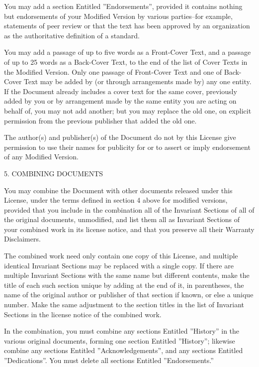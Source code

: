 You may add a section Entitled ''Endorsements'', provided it contains nothing but endorsements of your Modified Version
by various parties--for example, statements of peer review or that the text has been approved by an organization as the
authoritative definition of a standard.

You may add a passage of up to five words as a Front-Cover Text, and a passage of up to 25 words as a Back-Cover Text,
to the end of the list of Cover Texts in the Modified Version. Only one passage of Front-Cover Text and one of
Back-Cover Text may be added by (or through arrangements made by) any one entity. If the Document already includes a
cover text for the same cover, previously added by you or by arrangement made by the same entity you are acting on
behalf of, you may not add another; but you may replace the old one, on explicit permission from the previous publisher
that added the old one.

The author(s) and publisher(s) of the Document do not by this License give permission to use their names for publicity
for or to assert or imply endorsement of any Modified Version.

5. COMBINING DOCUMENTS

You may combine the Document with other documents released under this License, under the terms defined in section 4
above for modified versions, provided that you include in the combination all of the Invariant Sections of all of the
original documents, unmodified, and list them all as Invariant Sections of your combined work in its license notice,
and that you preserve all their Warranty Disclaimers.

The combined work need only contain one copy of this License, and multiple identical Invariant Sections may be replaced
with a single copy. If there are multiple Invariant Sections with the same name but different contents, make the title
of each such section unique by adding at the end of it, in parentheses, the name of the original author or publisher of
that section if known, or else a unique number. Make the same adjustment to the section titles in the list of Invariant
Sections in the license notice of the combined work.

In the combination, you must combine any sections Entitled ''History'' in the various original documents, forming one
section Entitled ''History''; likewise combine any sections Entitled ''Acknowledgements'', and any sections Entitled
''Dedications''. You must delete all sections Entitled ''Endorsements.''

